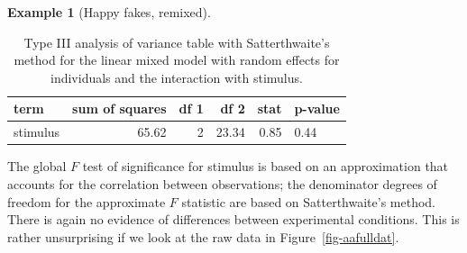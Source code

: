 \documentclass[
  11pt,
  letterpaper,
]{scrbook}
\theoremstyle{definition}
\newtheorem{example}{Example}[chapter]
\theoremstyle{definition}
\theoremstyle{remark}
\begin{document}
\begin{example}[Happy fakes,
remixed]
\begin{longtable}[]{@{}lrrrrl@{}}

\caption{\label{tbl-happyfake-rep-anova}Type III analysis of variance
table with Satterthwaite's method for the linear mixed model with random
effects for individuals and the interaction with stimulus.}

\tabularnewline

\toprule\noalign{}
term & sum of squares & df 1 & df 2 & stat & p-value \\
\midrule\noalign{}
\endhead
\bottomrule\noalign{}
\endlastfoot
stimulus & 65.62 & 2 & 23.34 & 0.85 & 0.44 \\

\end{longtable}

The global \(F\) test of significance for stimulus is based on an
approximation that accounts for the correlation between observations;
the denominator degrees of freedom for the approximate \(F\) statistic
are based on Satterthwaite's method. There is again no evidence of
differences between experimental conditions. This is rather unsurprising
if we look at the raw data in Figure~\ref{fig-aafulldat}.

\end{example}
\end{document}
